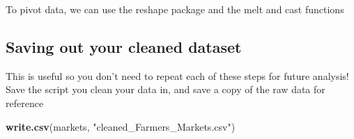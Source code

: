 \documentclass[]{article}
\newenvironment{Shaded}{\begin{snugshade}}{\end{snugshade}}
\newcommand{\KeywordTok}[1]{\textcolor[rgb]{0.13,0.29,0.53}{\textbf{#1}}}
\newcommand{\StringTok}[1]{\textcolor[rgb]{0.31,0.60,0.02}{#1}}
\newcommand{\NormalTok}[1]{#1}
\begin{document}
To pivot data, we can use the reshape package and the melt and cast
functions

\subsection{Saving out your cleaned
dataset}\label{saving-out-your-cleaned-dataset}

This is useful so you don't need to repeat each of these steps for
future analysis! Save the script you clean your data in, and save a copy
of the raw data for reference

\begin{Shaded}
\begin{Highlighting}[]
\KeywordTok{write.csv}\NormalTok{(markets, }\StringTok{"cleaned_Farmers_Markets.csv"}\NormalTok{)}
\end{Highlighting}
\end{Shaded}
\end{document}
